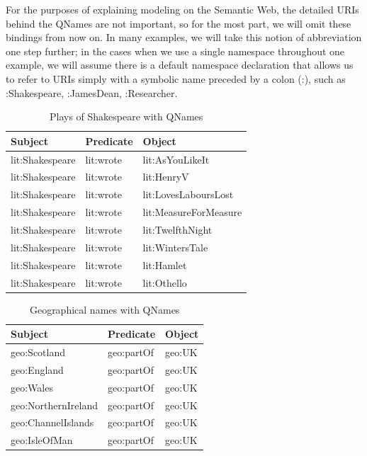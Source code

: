 For the purposes of explaining modeling on the Semantic Web, the
detailed URIs behind the QNames are not important, so for the most part,
we will omit these bindings from now on. In many examples, we will take
this notion of abbreviation one step further; in the cases when we use a
single namespace throughout one example, we will assume there is a
default namespace declaration that allows us to refer to URIs simply
with a symbolic name preceded by a colon (:), such as :Shakespeare,
:JamesDean, :Researcher.

\begin{table}[h]
\centering
\begin{tabular}{||l l l ||} 
 \hline
 Subject&Predicate&Object \\ [0.5ex] 
 \hline\hline
lit:Shakespeare&lit:wrote&lit:AsYouLikeIt\\
lit:Shakespeare&lit:wrote&lit:HenryV\\
lit:Shakespeare&lit:wrote&lit:LovesLaboursLost\\
lit:Shakespeare&lit:wrote&lit:MeasureForMeasure\\
lit:Shakespeare&lit:wrote&lit:TwelfthNight\\
lit:Shakespeare&lit:wrote&lit:WintersTale\\
lit:Shakespeare&lit:wrote&lit:Hamlet\\
lit:Shakespeare&lit:wrote&lit:Othello\\
\hline
\end{tabular}
\caption{Plays of Shakespeare with QNames}
\label{tab:ch3.6}
\end{table}



\begin{table}[h]
\centering
\begin{tabular}{||l l l ||} 
 \hline
 Subject&Predicate&Object \\ [0.5ex] 
 \hline\hline
geo:Scotland&geo:partOf&geo:UK \\
geo:England&geo:partOf&geo:UK \\
geo:Wales&geo:partOf&geo:UK \\
geo:NorthernIreland&geo:partOf&geo:UK \\
geo:ChannelIslands&geo:partOf&geo:UK \\
geo:IsleOfMan&geo:partOf&geo:UK \\
\hline
\end{tabular}
\caption{Geographical names with QNames}
\label{tab:ch3.7}
\end{table}

